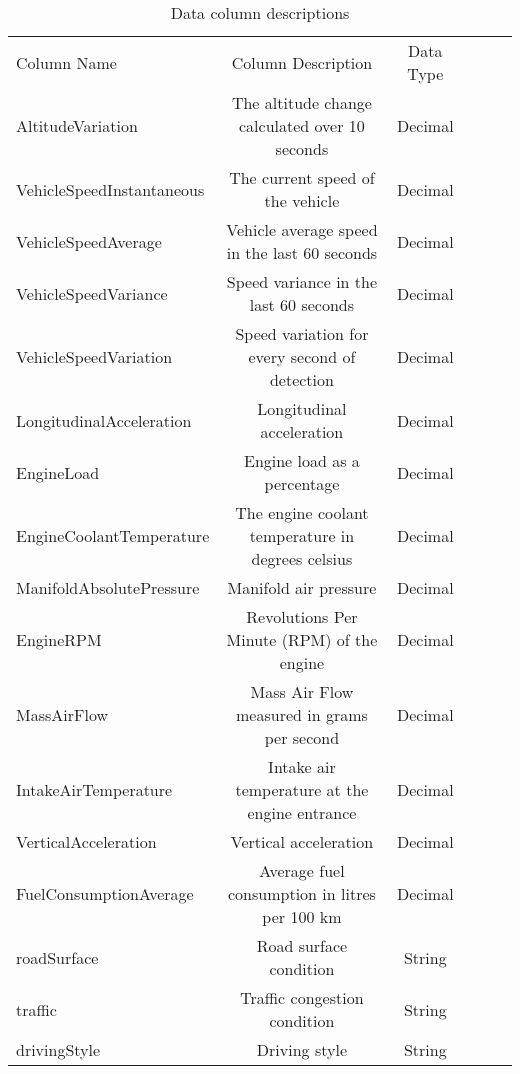 \documentclass[a4paper,11pt]{article}
\begin{document}
\begin{table}[!ht]
	\caption{Data column descriptions}\label{tab:column_types}
	\centering
	\begin{tabular}{lccccc}\toprule
		Column Name & Column Description & Data Type \\ 
		AltitudeVariation & The altitude change calculated over 10 seconds & Decimal \\ 
		VehicleSpeedInstantaneous & The current speed of the vehicle & Decimal \\ 
		VehicleSpeedAverage & Vehicle average speed in the last 60 seconds & Decimal \\ 
		VehicleSpeedVariance & Speed variance in the last 60 seconds & Decimal \\ 
		VehicleSpeedVariation & Speed variation for every second of detection & Decimal \\ 
		LongitudinalAcceleration & Longitudinal acceleration & Decimal \\ 
		EngineLoad & Engine load as a percentage & Decimal \\ 
		EngineCoolantTemperature & The engine coolant temperature in degrees celsius & Decimal \\ 
		ManifoldAbsolutePressure & Manifold air pressure & Decimal \\ 
		EngineRPM & Revolutions Per Minute (RPM) of the engine & Decimal \\ 
		MassAirFlow & Mass Air Flow measured in grams per second & Decimal \\ 
		IntakeAirTemperature & Intake air temperature at the engine entrance & Decimal \\ 
		VerticalAcceleration & Vertical acceleration & Decimal \\ 
		FuelConsumptionAverage & Average fuel consumption in litres per 100 km & Decimal \\ 
		roadSurface & Road surface condition & String \\ 
		traffic & Traffic congestion condition & String \\ 
		drivingStyle & Driving style & String \\ \bottomrule
	\end{tabular}
\end{table}
\end{document}
